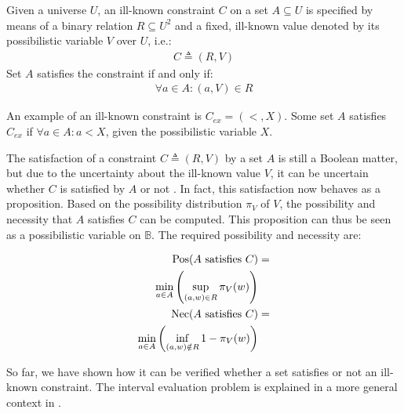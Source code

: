 \begin{definition}
Given a universe $U$, an ill-known constraint $C$ on a set $A \subseteq U$ is specified by means of a binary relation $R \subseteq U^{2}$ and a fixed, ill-known value denoted by its possibilistic variable $V$ over $U$, i.e.:
\begin{align}
\label{eq:ill-known-constraint}
C \triangleq (R,V)
\end{align}
Set $A$ satisfies the constraint if and only if:
\begin{align}
\forall a \in A : (a,V) \in R
\end{align}
\end{definition}

An example of an ill-known constraint is $C_{ex} = (<, X)$. Some set $A$ satisfies $C_{ex}$ if $\forall a \in A : a < X$, given the possibilistic variable $X$.

The satisfaction of a constraint $C \triangleq (R,V)$ by a set $A$ is still a Boolean matter, but due to the uncertainty about the ill-known value $V$, it can be uncertain whether $C$ is satisfied by $A$ or not \cite{Pons2011}. In fact, this satisfaction now behaves as a proposition. Based on the possibility distribution $\pi_{V}$ of $V$, the possibility and necessity that $A$ satisfies $C$ can be computed. This proposition can thus be seen as a possibilistic variable on $\mathbb{B}$. The required possibility and necessity are:

\vspace{-10pt}

\begin{align}
\label{ill-known-pos}\
\operatorname{Pos}(A\text{ satisfies }C) & =\\
\nonumber
\min_{a \in A}\left(\sup_{(a,w) \in R}\pi_{V}(w)\right) \\
\label{ill-known-nec}
\operatorname{Nec}(A\text{ satisfies }C) & =\\
\nonumber
\min_{a \in A}\left(\inf_{(a,w) \notin R} 1-\pi_{V}(w)\right) 
\end{align}

So far, we have shown how it can be verified whether a set satisfies or not an ill-known constraint. The interval evaluation problem is explained in a more general context in \cite{Pons2011}.

